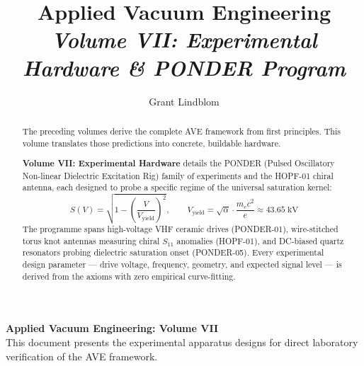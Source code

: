 \title{\textbf{Applied Vacuum Engineering} \\ \large \textit{Volume VII: Experimental Hardware \& PONDER Program}}
\author{Grant Lindblom}
\date{}

\maketitle

\vfill
\noindent\textbf{Applied Vacuum Engineering: Volume VII} \\
This document presents the experimental apparatus designs for direct laboratory verification of the AVE framework.

\begin{abstract}
    The preceding volumes derive the complete AVE framework from first principles. This volume translates those predictions into concrete, buildable hardware.

    \textbf{Volume VII: Experimental Hardware} details the PONDER (Pulsed Oscillatory Non-linear Dielectric Excitation Rig) family of experiments and the HOPF-01 chiral antenna, each designed to probe a specific regime of the universal saturation kernel:
    \begin{equation}
        S(V) = \sqrt{1 - \left(\frac{V}{V_\text{yield}}\right)^{\!2}}, \qquad V_\text{yield} = \sqrt{\alpha} \cdot \frac{m_e c^2}{e} \approx 43.65\;\text{kV}
    \end{equation}
    The programme spans high-voltage VHF ceramic drives (PONDER-01), wire-stitched torus knot antennas measuring chiral $S_{11}$ anomalies (HOPF-01), and DC-biased quartz resonators probing dielectric saturation onset (PONDER-05). Every experimental design parameter --- drive voltage, frequency, geometry, and expected signal level --- is derived from the axioms with zero empirical curve-fitting.
\end{abstract}

